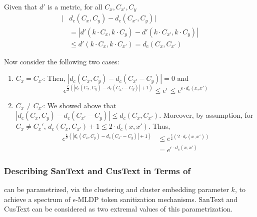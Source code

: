 
\noindent
Given that $d'$ is a metric, for all $C_x, C_{x'}, C_y$
\begin{align*}
    |&d_c(C_x, C_y) - d_c(C_{x'}, C_y)| \\
    &= |d'(k \cdot C_x, k\cdot C_y) - d'(k \cdot C_{x'}, k \cdot C_y)|\\
    &\leq d'(k \cdot C_x, k\cdot C_{x'}) = d_c(C_x, C_{x'})
\end{align*}

\noindent

\noindent
Now consider the following two cases:
\begin{enumerate}
\setlength\itemsep{0em}
    \item $C_x = C_{x'}$: Then, $|d_c(C_x, C_y) - d_c(C_{x'} - C_y)| = 0$ and $$e^{\frac{\epsilon}{2}(|d_c(C_x, C_y) - d_c(C_{x'} - C_y)| +1)} \leq e^\epsilon \leq e^{\epsilon\cdot d_c(x, x')}$$ 
    \item $C_x \not= C_{x'}$: We showed above that  $|d_c(C_x, C_y) - d_c(C_{x'} - C_y)| \leq d_c(C_x, C_{x'})$. Moreover, by assumption, for $C_x \not= C_x'$, $d_c(C_x, C_{x'}) + 1 \leq 2\cdot d_c(x, x')$. 
    Thus, 
    \begin{align*}
        e^{\frac{\epsilon}{2}(|d_c(C_x, C_y) - d_c(C_{x'} - C_y)| +1)} &\leq e^{\frac{\epsilon}{2}(2\cdot d_c(x, x'))}\\
        &=e^{\epsilon\cdot d_c(x, x')}
    \end{align*} 
\end{enumerate}

\subsubsection{Describing SanText and CusText in Terms of \clusant}\label{sec:prev_work_wrt_clusant}
\clusant can be parametrized, via the clustering and cluster embedding parameter $k$, to achieve a spectrum of $\epsilon$-MLDP token sanitization mechanisms. SanText and CusText can be considered as two extremal values of this parametrization.

